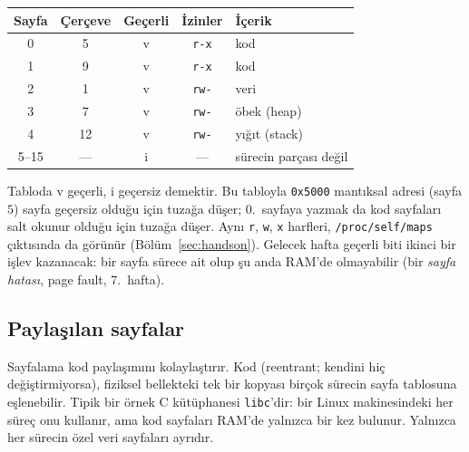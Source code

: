 \begin{center}
\renewcommand{\arraystretch}{1.2}
\begin{tabular}{@{}ccccl@{}}
\toprule
\textbf{Sayfa} & \textbf{Çerçeve} & \textbf{Geçerli} & \textbf{İzinler} & \textbf{İçerik} \\
\midrule
0 & 5 & v & \texttt{r-x} & kod \\
1 & 9 & v & \texttt{r-x} & kod \\
2 & 1 & v & \texttt{rw-} & veri \\
3 & 7 & v & \texttt{rw-} & öbek (heap) \\
4 & 12 & v & \texttt{rw-} & yığıt (stack) \\
5--15 & --- & i & --- & sürecin parçası değil \\
\bottomrule
\end{tabular}
\end{center}

Tabloda v geçerli, i geçersiz demektir. Bu tabloyla \texttt{0x5000} mantıksal adresi (sayfa $5$) sayfa geçersiz olduğu için tuzağa düşer; $0$.~sayfaya yazmak da kod sayfaları salt okunur olduğu için tuzağa düşer. Aynı \texttt{r}, \texttt{w}, \texttt{x} harfleri, \texttt{/proc/self/maps} çıktısında da görünür (Bölüm~\ref{sec:handson}). Gelecek hafta geçerli biti ikinci bir işlev kazanacak: bir sayfa sürece ait olup şu anda RAM'de olmayabilir (bir \emph{sayfa hatası}, page fault, 7.~hafta).

\subsection{Paylaşılan sayfalar}

Sayfalama kod paylaşımını kolaylaştırır. Kod  (reentrant; kendini hiç değiştirmiyorsa), fiziksel bellekteki tek bir kopyası birçok sürecin sayfa tablosuna eşlenebilir. Tipik bir örnek C kütüphanesi \texttt{libc}'dir: bir Linux makinesindeki her süreç onu kullanır, ama kod sayfaları RAM'de yalnızca bir kez bulunur. Yalnızca her sürecin özel veri sayfaları ayrıdır.

